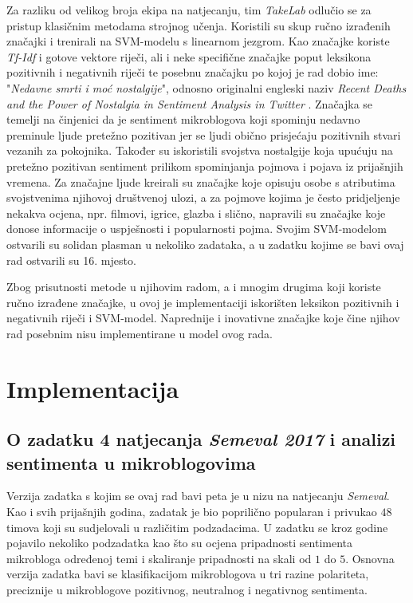 \documentclass[times, utf8, zavrsni]{fer}
\begin{document}
Za razliku od velikog broja ekipa na natjecanju, tim \textit{TakeLab} odlučio se za pristup klasičnim metodama strojnog učenja. Koristili su skup ručno izrađenih značajki i trenirali na \gls{SVM}-modelu s linearnom jezgrom. Kao značajke koriste \emph{Tf-Idf} i gotove vektore riječi, ali i neke specifične značajke poput leksikona pozitivnih i negativnih riječi te posebnu značajku po kojoj je rad dobio ime: "\textit{Nedavne smrti i moć nostalgije}", odnosno originalni engleski naziv \textit{Recent Deaths and the Power of Nostalgia in Sentiment Analysis in Twitter} \citep{2017-takelab}. Značajka se temelji na činjenici da je sentiment mikroblogova koji spominju nedavno preminule ljude pretežno pozitivan jer se ljudi obično prisjećaju pozitivnih stvari vezanih za pokojnika. Također su iskoristili svojstva nostalgije koja upućuju na pretežno pozitivan sentiment prilikom spominjanja pojmova i pojava iz prijašnjih vremena. Za značajne ljude kreirali su značajke koje opisuju osobe s atributima svojstvenima njihovoj društvenoj ulozi, a za pojmove kojima je često pridjeljenje nekakva ocjena, npr. filmovi, igrice, glazba i slično, napravili su značajke koje donose informacije o uspješnosti i popularnosti pojma. Svojim \gls{SVM}-modelom ostvarili su solidan plasman u nekoliko zadataka, a u zadatku kojime se bavi ovaj rad ostvarili su 16. mjesto.

Zbog prisutnosti metode u njihovim radom, a i mnogim drugima koji koriste ručno izrađene značajke, u ovoj je implementaciji iskorišten leksikon pozitivnih i negativnih riječi i \gls{SVM}-model. Naprednije i inovativne značajke koje čine njihov rad posebnim nisu implementirane u model ovog rada.

\chapter{Implementacija}

\section{O zadatku 4 natjecanja \emph{Semeval 2017} i analizi sentimenta u mikroblogovima}

Verzija zadatka s kojim se ovaj rad bavi peta je u nizu na natjecanju \emph{Semeval}. Kao i svih prijašnjih godina, zadatak je bio poprilično popularan i privukao $48$ timova koji su sudjelovali u različitim podzadacima. U zadatku se kroz godine pojavilo nekoliko podzadatka kao što su ocjena pripadnosti sentimenta mikrobloga određenoj temi i skaliranje pripadnosti na skali od $1$ do $5$. Osnovna verzija zadatka bavi se klasifikacijom mikroblogova u tri razine polariteta, preciznije u mikroblogove pozitivnog, neutralnog i negativnog sentimenta. 
\end{document}

